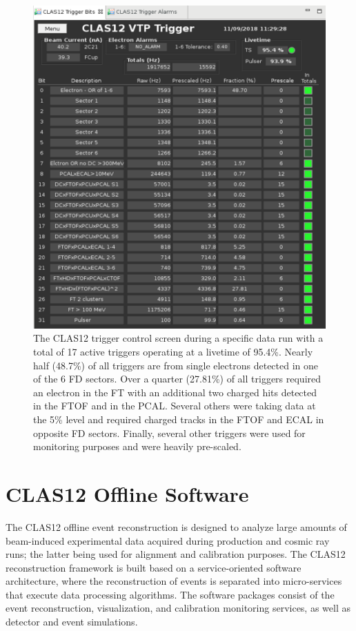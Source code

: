 \documentclass[final,3p,twocolumn]{elsarticle}
\begin{document}
\begin{figure}[t!]
\centerline{\includegraphics[width=1.0\columnwidth]{CLAS12-triggers.png}}
\caption{The CLAS12 trigger control screen during a specific data run with a total of 17 active triggers operating at
  a livetime of 95.4\%. Nearly half (48.7\%) of all triggers are from single electrons detected in one of the 6 FD
  sectors. Over a quarter (27.81\%) of all triggers required an electron in the FT with an additional two charged hits
  detected in the FTOF and in the PCAL. Several others were taking data at the 5\% level and required charged tracks
  in the FTOF and ECAL in opposite FD sectors. Finally, several other triggers were used for monitoring purposes and
  were heavily pre-scaled.}
\label{CLAS12-triggers}
\end{figure}

\section{CLAS12 Offline Software}  

The CLAS12 offline event reconstruction is designed to analyze large amounts of beam-induced experimental data
acquired during production and cosmic ray runs; the latter being used for alignment and calibration purposes. The
CLAS12 reconstruction framework is built based on a service-oriented software architecture, where the
reconstruction of events is separated into micro-services that execute data processing algorithms. The software
packages consist of the event reconstruction, visualization, and calibration monitoring services, as well as detector
and event simulations. 
\end{document}

